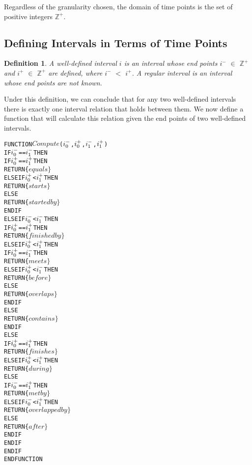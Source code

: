\documentclass[11pt]{report}
\newtheorem{vdefinition}{Definition}
\newenvironment{vverbatim}
{
  \begin{alltt}
}
{
  \vspace{-\baselineskip}
  \end{alltt}
}
\begin{document}
        Regardless of the granularity chosen, the domain of time points is the set of
        positive integers ${\mathbb Z}^{+}$.

      \subsection{Defining Intervals in Terms of Time Points}

        \begin{vdefinition}
          \label{def-interval}
          A {\em well-defined interval} $i$ is an interval whose end points $i^{-}$
          $\in$ ${\mathbb Z}^{+}$ and $i^{+}$ $\in$ ${\mathbb Z}^{+}$ are defined,
          where $i^{-}$ $<$ $i^{+}$. A {\em regular interval} is an interval whose
          end points are not known.
        \end{vdefinition}

        Under this definition, we can conclude that for any two well-defined
        intervals there is exactly one interval relation that holds between
        them. We now define a function that will calculate this relation given
        the end points of two well-defined intervals.

        \begin{vverbatim}
  FUNCTION \(Compute\)(\(i\sb{0}\sp{-}\), \(i\sb{0}\sp{+}\), \(i\sb{1}\sp{-}\), \(i\sb{1}\sp{+}\))
    IF \(i\sb{0}\sp{-}\) == \(i\sb{1}\sp{-}\) THEN
      IF \(i\sb{0}\sp{+}\) == \(i\sb{1}\sp{+}\) THEN
        RETURN \{\(equals\}\)
      ELSE IF \(i\sb{0}\sp{+}\) < \(i\sb{1}\sp{+}\) THEN
        RETURN \{\(starts\}\)
      ELSE
        RETURN \{\(started by\}\)
      ENDIF 
    ELSE IF \(i\sb{0}\sp{-}\) < \(i\sb{1}\sp{-}\) THEN
      IF \(i\sb{0}\sp{+}\) == \(i\sb{1}\sp{+}\) THEN
        RETURN \{\(finished by\}\)
      ELSE IF \(i\sb{0}\sp{+}\) < \(i\sb{1}\sp{+}\) THEN
        IF \(i\sb{0}\sp{+}\) == \(i\sb{1}\sp{-}\) THEN
          RETURN \{\(meets\}\)
        ELSE IF \(i\sb{0}\sp{+}\) < \(i\sb{1}\sp{-}\) THEN
          RETURN \{\(before\}\)
        ELSE
          RETURN \{\(overlaps\}\)
        ENDIF
      ELSE
        RETURN \{\(contains\}\)
      ENDIF
    ELSE
      IF \(i\sb{0}\sp{+}\) == \(i\sb{1}\sp{+}\) THEN
        RETURN \{\(finishes\}\)
      ELSE IF \(i\sb{0}\sp{+}\) < \(i\sb{1}\sp{+}\) THEN
        RETURN \{\(during\}\)
      ELSE
        IF \(i\sb{0}\sp{-}\) == \(i\sb{1}\sp{+}\) THEN 
          RETURN \{\(met by\}\)
        ELSE IF \(i\sb{0}\sp{-}\) < \(i\sb{1}\sp{+}\) THEN  
          RETURN \{\(overlapped by\}\)
        ELSE
          RETURN \{\(after\}\)
        ENDIF
      ENDIF
    ENDIF
  ENDFUNCTION
        \end{vverbatim}
\end{document}
